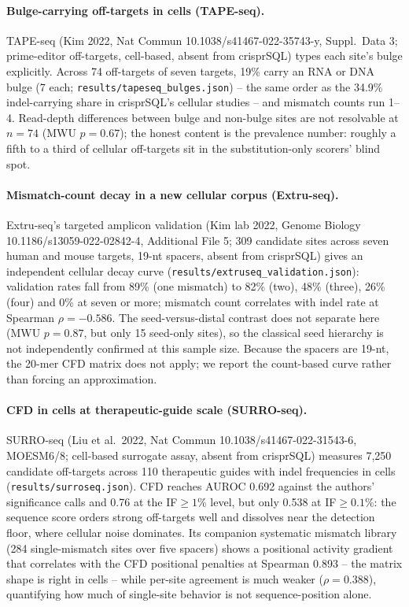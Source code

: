 \documentclass[12pt]{article}
\begin{document}
\paragraph{Bulge-carrying off-targets in cells (TAPE-seq).} TAPE-seq
(Kim 2022, Nat Commun 10.1038/s41467-022-35743-y, Suppl.\ Data 3;
prime-editor off-targets, cell-based, absent from crisprSQL) types each
site's bulge explicitly. Across 74 off-targets of seven targets, 19\%
carry an RNA or DNA bulge (7 each; \texttt{results/tapeseq\_bulges.json})
-- the same order as the 34.9\% indel-carrying share in crisprSQL's
cellular studies -- and mismatch counts run 1--4. Read-depth differences
between bulge and non-bulge sites are not resolvable at $n=74$ (MWU
$p=0.67$); the honest content is the prevalence number: roughly a fifth
to a third of cellular off-targets sit in the substitution-only scorers'
blind spot.
\paragraph{Mismatch-count decay in a new cellular corpus (Extru-seq).}
Extru-seq's targeted amplicon validation (Kim lab 2022, Genome Biology
10.1186/s13059-022-02842-4, Additional File 5; 309 candidate sites
across seven human and mouse targets, 19-nt spacers, absent from
crisprSQL) gives an independent cellular decay curve
(\texttt{results/extruseq\_validation.json}): validation rates fall from
89\% (one mismatch) to 82\% (two), 48\% (three), 26\% (four) and 0\% at
seven or more; mismatch count correlates with indel rate at
Spearman $\rho=-0.586$. The seed-versus-distal contrast does not
separate here (MWU $p=0.87$, but only 15 seed-only sites), so the
classical seed hierarchy is not independently confirmed at this sample
size. Because the spacers are 19-nt, the 20-mer CFD matrix does not
apply; we report the count-based curve rather than forcing an
approximation.
\paragraph{CFD in cells at therapeutic-guide scale (SURRO-seq).}
SURRO-seq (Liu et al.\ 2022, Nat Commun 10.1038/s41467-022-31543-6,
MOESM6/8; cell-based surrogate assay, absent from crisprSQL) measures
7,250 candidate off-targets across 110 therapeutic guides with indel
frequencies in cells (\texttt{results/surroseq.json}). CFD reaches
AUROC 0.692 against the authors' significance calls and 0.76 at the
IF${}\ge1\%$ level, but only 0.538 at IF${}\ge0.1\%$: the sequence
score orders strong off-targets well and dissolves near the detection
floor, where cellular noise dominates. Its companion systematic
mismatch library (284 single-mismatch sites over five spacers) shows a
positional activity gradient that correlates with the CFD positional
penalties at Spearman 0.893 -- the matrix shape is right in cells --
while per-site agreement is much weaker ($\rho=0.388$), quantifying how
much of single-site behavior is not sequence-position alone.
\end{document}
